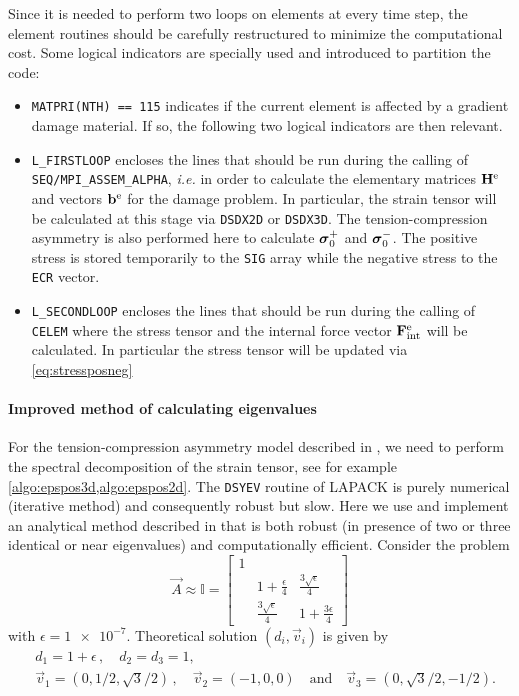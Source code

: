Since it is needed to perform two loops on elements at every time step, the element routines should be carefully restructured to minimize the computational cost. Some logical indicators are specially used and introduced to partition the code:
\begin{itemize}
\item \texttt{MATPRI(NTH) == 115} indicates if the current element is affected by a gradient damage material. If so, the following two logical indicators are then relevant.

\item \texttt{L\_FIRSTLOOP} encloses the lines that should be run during the calling of \texttt{SEQ/MPI\_ASSEM\_ALPHA}, \emph{i.e.} in order to calculate the elementary matrices $\vec{H}^\me$ and vectors $\vec{b}^\me$ for the damage problem. In particular, the strain tensor will be calculated at this stage via \texttt{DSDX2D} or \texttt{DSDX3D}. The tension-compression asymmetry is also performed here to calculate $\sig_0^+$ and $\sig_0^-$. The positive stress is stored temporarily to the \texttt{SIG} array while the negative stress to the \texttt{ECR} vector.

\item \texttt{L\_SECONDLOOP} encloses the lines that should be run during the calling of \texttt{CELEM} where the stress tensor and the internal force vector $\vec{F}_\mathrm{int}^\me$ will be calculated. In particular the stress tensor will be updated via \eqref{eq:stressposneg}
\end{itemize}

\paragraph{Improved method of calculating eigenvalues}
For the tension-compression asymmetry model described in \cite{MieheHofackerWelschinger:2010,FreddiRoyer-Carfagni:2010}, we need to perform the spectral decomposition of the strain tensor, see for example \cref{algo:epspos3d,algo:epspos2d}. The \texttt{DSYEV} routine of LAPACK is purely numerical (iterative method) and consequently robust but slow. Here we use and implement an analytical method described in \cite{Scherzinger:2008aa} that is both robust (in presence of two or three identical or near eigenvalues) and computationally efficient. Consider the problem
\[
\vec{A}\approx\mathbb{I}=\begin{bmatrix}
1 & &  \\
& 1+\frac{\epsilon}{4} & \frac{3\sqrt{\epsilon}}{4} \\
& \frac{3\sqrt{\epsilon}}{4} & 1+\frac{3\epsilon}{4}
\end{bmatrix}
\]
with $\epsilon=\num{1e-7}$. Theoretical solution $(d_i,\vec{v}_i)$ is given by
\begin{equation} \label{eq:eigenvalueana}
\begin{aligned}
& d_1=1+\epsilon\,,\quad d_2=d_3=1, \\
& \vec{v}_1=(0, 1/2, \sqrt{3}/2)\,,\quad \vec{v}_2=(-1, 0, 0)\quad\text{and}\quad\vec{v}_3=(0, \sqrt{3}/2, -1/2).
\end{aligned}
\end{equation}

